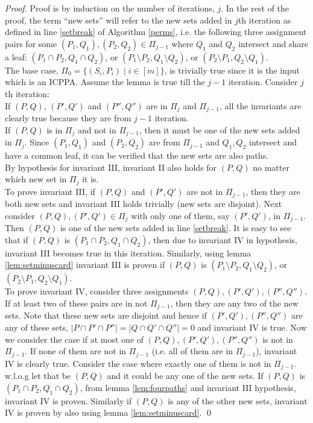 \documentclass[MS]             %
              {iitmdiss_as}    %
\begin{document}
\begin{proof}
  Proof is by induction on the number of iterations, $j$. In the rest
  of the proof, the term ``new sets'' will refer to the new sets added
  in $j$th iteration as defined in line \ref{setbreak} of Algorithm
  \ref{perms}, i.e. the following three assignment pairs for some
  $(P_1,Q_1), (P_2,Q_2) \in \Pi_{j-1}$ where $Q_1$ and $Q_2$ intersect
  and share a leaf: $(P_1 \cap P_2, Q_1 \cap Q_2)$, or $(P_1 \setminus
  P_2, Q_1 \setminus Q_2)$, or $(P_2 \setminus P_1, Q_2
  \setminus Q_1)$.\\
  \noindent
  The base case, $\Pi_0 = \{(S_i,P_i) \mid i \in [m]\}$, is trivially
  true since it is the input which is an ICPPA.  Assume the lemma is
  true till the $j-1$ iteration. Consider $j$th
  iteration:\\
  \noindent
  If $(P,Q)$, $(P',Q')$ and $(P'',Q'')$ are in $\Pi_{j}$ and
  $\Pi_{j-1}$, all the invariants are
  clearly true because they are from $j-1$ iteration.\\
  If $(P,Q)$ is in $\Pi_{j}$ and not in $\Pi_{j-1}$, then it must be
  one of the new sets added in $\Pi_j$. Since $(P_1,Q_1)$ and
  $(P_2,Q_2)$ are from $\Pi_{j-1}$ and $Q_1,Q_2$ intersect and have a
  common leaf, it can be verified that the
  new sets are also paths. \\
  By hypothesis for invariant III, invariant II also holds for $(P,Q)$
  no matter which new set in $\Pi_j$ it
  is.\\
  To prove invariant III, if $(P,Q)$ and $(P',Q')$ are not in
  $\Pi_{j-1}$, then they are both new sets and invariant III holds
  trivially (new sets are disjoint). Next consider $(P,Q), (P',Q') \in
  \Pi_j$ with only one of them, say $(P',Q')$, in $\Pi_{j-1}$. Then
  $(P,Q)$ is one of the new sets added in line \ref{setbreak}. It is
  easy to see that if $(P,Q)$ is $(P_1 \cap P_2, Q_1 \cap Q_2)$, then
  due to invariant IV in hypothesis, invariant III becomes true in
  this iteration. Similarly, using lemma \ref{lem:setminuscard}
  invariant III is proven if $(P, Q)$ is $(P_1 \setminus P_2, Q_1
  \setminus Q_2)$, or $(P_2 \setminus P_1, Q_2
  \setminus Q_1)$.\\
  To prove invariant IV, consider three assignments
  $(P,Q),(P',Q'),(P'',Q'')$. If at least two of these pairs are in not
  $\Pi_{j-1}$, then they are any two of the new sets. Note that these
  new sets are disjoint and hence if $(P',Q'), (P'',Q'')$ are any of
  these sets, $|P \cap P' \cap P''|=|Q \cap Q' \cap Q''|=0$ and
  invariant IV is true. Now we consider the case if at most one of
  $(P,Q),(P',Q'),(P'',Q'')$ is not in $\Pi_{j-1}$. If none of them are
  not in $\Pi_{j-1}$ (i.e. all of them are in $\Pi_{j-1}$), invariant
  IV is clearly true. Consider the case where exactly one of them is
  not in $\Pi_{j-1}$. w.l.o.g let that be $(P,Q)$ and it could be any
  one of the new sets. If $(P,Q)$ is $(P_1 \cap P_2, Q_1 \cap Q_2)$,
  from lemma \ref{lem:fourpaths} and invariant III hypothesis,
  invariant IV is proven. Similarly if $(P,Q)$ is any of the other new
  sets, invariant IV is proven by also using lemma
  \ref{lem:setminuscard}. \qed

\end{proof}
\end{document}
